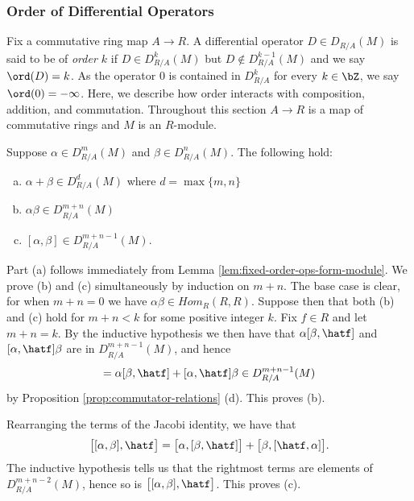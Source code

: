 \subsubsection{Order of Differential Operators}
Fix a commutative ring map $A\to R$. A differential operator $D \in D_{R/A}(M)$ is said to be of \emph{order $k$} if $D \in D^k_{R/A}(M)$ but $D \not\in D^{k-1}_{R/A}(M)$ and we say $\ord(D) = k$. As the operator $0$ is contained in $D^k_{R/A}$ for every $k \in \bZ$, we say $\ord(0) = -\infty$. Here, we describe how order interacts with composition, addition, and commutation. Throughout this section $A\to R$ is a map of commutative rings and $M$ is an $R$-module.

\begin{prop}\label{prop:order-interactions}
	 Suppose $\alpha \in D^{m}_{R/A}(M)$ and $\beta \in D^{n}_{R/A}(M)$. The following hold:
	 \begin{enumerate}[(a)]
		 \item $\alpha+\beta \in D^d_{R/A}(M)$ where $d = \max\{m,n\}$
		 \item $\alpha\beta \in D^{m+n}_{R/A}(M)$
		 \item $[\alpha,\beta] \in D^{m+n -1}_{R/A}(M)$.
	 \end{enumerate}
\end{prop}
\begin{prf}
	Part (a) follows immediately from Lemma \ref{lem:fixed-order-ops-form-module}. We prove (b) and (c) simultaneously by induction on $m + n$. The base case is clear, for when $m + n = 0$ we have $\alpha\beta \in Hom_R(R,R)$. Suppose then that both (b) and (c) hold for $m + n < k$ for some positive integer $k$. Fix $f \in R$ and let $m+n = k$. By the inductive hypothesis we then have that $\alpha[\beta,\hatf]$ and $[\alpha,\hatf]\beta$ are in $D^{m+n-1}_{R/A}(M)$, and hence
	\begin{align*}
		[\alpha\beta,\hatf] = \alpha[\beta,\hatf] + [\alpha, \hatf]\beta \in D^{m+n-1}_{R/A}(M)
	\end{align*}
	by Proposition \ref{prop:commutator-relations} (d). This proves (b).

	Rearranging the terms of the Jacobi identity, we have that
	\begin{align*}
		\big[[\alpha,\beta], \hatf\big] = \big[\alpha, [\beta,\hatf]\big] + \big[\beta,[\hatf,\alpha]\big].
	\end{align*}
	The inductive hypothesis tells us that the rightmost terms are elements of $D^{m+n-2}_{R/A}(M)$, hence so is $\big[[\alpha,\beta], \hatf\big]$. This proves (c).
\end{prf}


